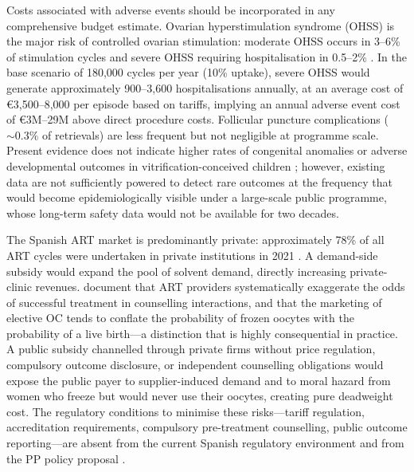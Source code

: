 \documentclass[12pt,a4paper]{article}
\begin{document}
Costs associated with adverse events should be incorporated in any
comprehensive budget estimate. Ovarian hyperstimulation syndrome (OHSS)
is the major risk of controlled ovarian stimulation: moderate OHSS
occurs in 3--6\% of stimulation cycles and severe OHSS requiring
hospitalisation in 0.5--2\% \citep{luke2012,pai2021}. In the base
scenario of 180,000 cycles per year (10\% uptake), severe OHSS would
generate approximately 900--3,600 hospitalisations annually, at an
average cost of \euro{}3,500--8,000 per episode based on
\citet{minsan2024} tariffs, implying an annual adverse event cost of
\euro{}3M--29M above direct procedure costs. Follicular puncture
complications (${\sim}0.3\%$ of retrievals) are less frequent but not
negligible at programme scale. Present evidence does not indicate higher
rates of congenital anomalies or adverse developmental outcomes in
vitrification-conceived children \citep{cobo2022,noyes2009}; however,
existing data are not sufficiently powered to detect rare outcomes at
the frequency that would become epidemiologically visible under a
large-scale public programme, whose long-term safety data would not be
available for two decades.

The Spanish ART market is predominantly private: approximately 78\% of
all ART cycles were undertaken in private institutions in 2021
\citep{sef2024registro}. A demand-side subsidy would expand the pool
of solvent demand, directly increasing private-clinic revenues.
\citet{deonandan2012} document that ART providers systematically
exaggerate the odds of successful treatment in counselling interactions,
and that the marketing of elective OC tends to conflate the probability
of frozen oocytes with the probability of a live birth---a distinction
that is highly consequential in practice. A public subsidy channelled
through private firms without price regulation, compulsory outcome
disclosure, or independent counselling obligations would expose the
public payer to supplier-induced demand \citep{evans1974} and to moral
hazard from women who freeze but would never use their oocytes, creating
pure deadweight cost. The regulatory conditions to minimise these
risks---tariff regulation, accreditation requirements, compulsory
pre-treatment counselling, public outcome reporting---are absent from
the current Spanish regulatory environment and from the PP policy
proposal \citep{partidopopular2025}.
\end{document}
